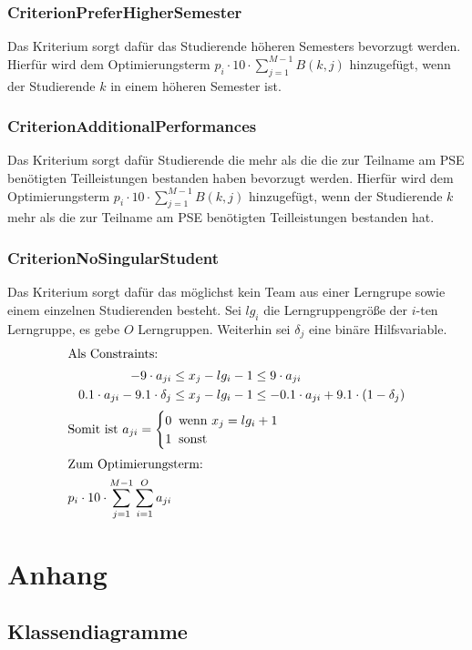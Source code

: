 \documentclass[parskip=full]{scrartcl}
\begin{document}
\subsubsection{CriterionPreferHigherSemester}
Das Kriterium sorgt dafür das Studierende höheren Semesters bevorzugt werden.
Hierfür wird dem Optimierungsterm $p_i \cdot 10 \cdot \sum_{j = 1}^{M-1} B(k,j)$ hinzugefügt, wenn der
Studierende $k$ in einem höheren Semester ist.
\subsubsection{CriterionAdditionalPerformances}
Das Kriterium sorgt dafür Studierende die mehr als die die zur Teilname am PSE
benötigten Teilleistungen bestanden haben bevorzugt werden. Hierfür wird dem Optimierungsterm
$p_i \cdot 10 \cdot \sum_{j = 1}^{M-1} B(k,j)$ hinzugefügt, wenn der Studierende
$k$ mehr als die zur Teilname am PSE benötigten Teilleistungen bestanden hat.
\subsubsection{CriterionNoSingularStudent}
Das Kriterium sorgt dafür das möglichst kein Team aus einer Lerngrupe sowie
einem einzelnen Studierenden besteht.
Sei $lg_i$ die Lerngruppengröße der $i$-ten Lerngruppe, es gebe $O$ Lerngruppen.
Weiterhin sei $\delta_j$ eine binäre Hilfsvariable.
\begin{align*}
\intertext{Als Constraints:} 
-9 \cdot a_{ji} &\le x_j -lg_i -1 \le 9\cdot a_{ji}\\
0.1 \cdot a_{ji} - 9.1 \cdot \delta_j &\le x_j -lg_i -1 \le -0.1 \cdot a_{ji} +
9.1 \cdot (1-\delta_j)\\
\intertext{$\text{Somit ist } a_{ji} = \begin{cases}
    0 \;\; \text{wenn $x_j = lg_i +1$} \\
    1 \;\; \text{sonst} 
\end{cases}$}
\intertext{Zum Optimierungsterm: }
p_i \cdot 10 \cdot \sum_{j = 1}^{M-1} \sum_{i = 1}^{O}a_{ji}
\end{align*}

 \section{Anhang}
\subsection{Klassendiagramme}
\end{document}

